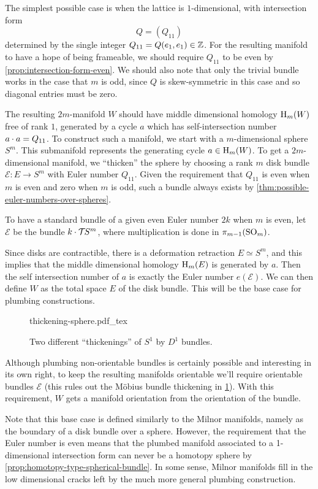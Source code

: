 The simplest possible case is when the lattice is $1$-dimensional, with intersection form
\[
	Q =  (Q_{11})
\]
determined by the single integer $Q_{11}=Q(e_1,e_1)\in \mathbb{Z}$.
For the resulting manifold to have a hope of being frameable, we should require $Q_{11}$ to be even by \cref{prop:intersection-form-even}. We should also note that only the trivial bundle works in the case that $m$ is odd, since $Q$ is skew-symmetric in this case and so diagonal entries must be zero.

The resulting $2m$-manifold $W$ should have middle dimensional homology $\operatorname{H}_m(W)$ free of rank $1$, generated by a cycle $a$ which has self-intersection number $a \cdot a= Q_{11}$. To construct such a manifold, we start with a $m$-dimensional sphere $S^m$. This submanifold represents the generating cycle $a\in \operatorname{H}_m(W)$.
To get a $2m$-dimensional manifold, we ``thicken'' the sphere by choosing a rank $m$ disk bundle $\mathcal{E} : E \to S^m$ with Euler number $Q_{11}$. Given the requirement that $Q_{11}$ is even when $m$ is even and zero when $m$ is odd, such a bundle always exists by \cref{thm:possible-euler-numbers-over-spheres}.
\begin{remark}
	To have a standard bundle of a given even Euler number $2k$ when $m$ is even, let $\mathcal{E}$ be the bundle $k\cdot {\mathcal{T}\hspace{-0.1em}} S^m$, where multiplication is done in $\pi_{m-1}(\mathrm{SO}_m)$.
\end{remark}
Since disks are contractible, there is a deformation retraction $E\simeq S^m$, and this implies that the middle dimensional homology $\operatorname{H}_m(E)$ is generated by $a$.
Then the self intersection number of $a$ is exactly the Euler number $e(\mathcal{E})$.
We can then define $W$ as the total space $E$ of the disk bundle. This will be the base case for plumbing constructions.
\begin{figure}[ht]
	\centering
	{thickening-sphere.pdf_tex}
	\caption{Two different ``thickenings'' of $S^1$ by $D^1$ bundles.}\label{fig:thickening-sphere}
\end{figure}
\begin{remark}
	Although plumbing non-orientable bundles is certainly possible and interesting in its own right, to keep the resulting manifolds orientable we'll require orientable bundles $\mathcal{E}$ (this rules out the M\"obius bundle thickening in \cref{fig:thickening-sphere}). With this requirement, $W$ gets a manifold orientation from the orientation of the bundle.
\end{remark}

\begin{remark}
	Note that this base case is defined similarly to the Milnor manifolds, namely as the boundary of a disk bundle over a sphere. However, the requirement that the Euler number is even means that the plumbed manifold associated to a 1-dimensional intersection form can never be a homotopy sphere by \cref{prop:homotopy-type-spherical-bundle}. In some sense, Milnor manifolds fill in the low dimensional cracks left by the much more general plumbing construction.
\end{remark}
